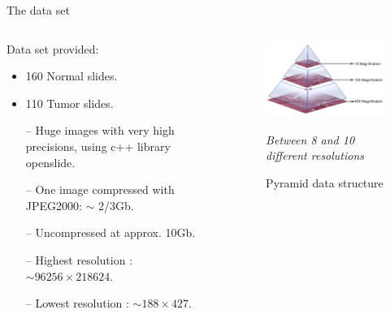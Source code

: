 \documentclass{beamer}
\begin{document}
\begin{frame}[noframenumbering]{The data set}
\begin{columns}[T] %
\begin{column}{.5\textwidth}
Data set provided:
\begin{itemize}
\item 160 Normal slides.
\item 110 Tumor slides.
\end{itemize} 

\begin{small}

\begin{itemize}
\item [--] Huge images with very high precisions, using c++ library openslide. 
\item [--] One image compressed with JPEG2000: $\sim$ 2/3Gb. 
\item [--] Uncompressed at approx. 10Gb. 
\item [--] Highest resolution : $\sim 96 256\times 218624$.
\item [--] Lowest resolution : $\sim 188 \times 427$. 
\end{itemize}
\end{small}

\end{column}%
\hfill%
\begin{column}{.5\textwidth}
\begin{figure}[!ht]
\centering
\includegraphics[width=\textwidth]{pyramid.png}
\caption{Pyramid data structure}
\textit{Between 8 and 10 different resolutions}
\label{}
\end{figure}
\end{column}%
\end{columns}

\end{frame}
\end{document}

